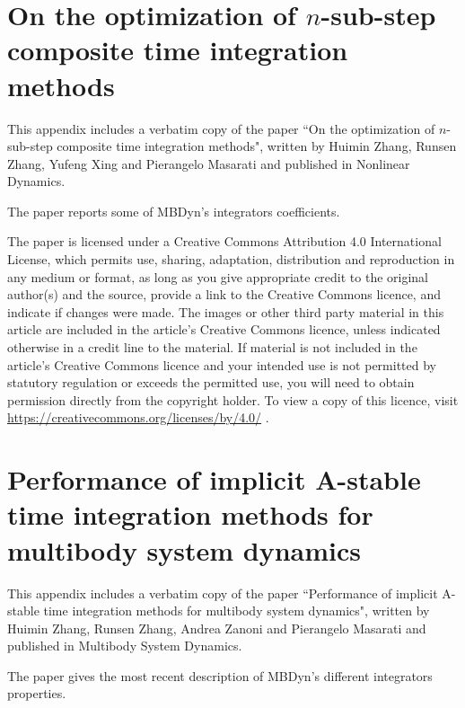\documentclass[10pt,fleqn,subeqn]{report}
\begin{document}



\appendix
\chapter{On the optimization of $n$-sub-step composite time
integration methods}
\label{appendix:integrators1}
This appendix includes a verbatim copy of the paper ``On the optimization of $n$-sub-step composite time
integration methods", written by Huimin Zhang,
Runsen Zhang, Yufeng Xing and Pierangelo Masarati and published in
Nonlinear Dynamics. 

The paper reports some of MBDyn's integrators coefficients.

The paper is licensed under a Creative Commons Attribution 4.0
International License, which permits use, sharing, adaptation, distribution and
reproduction in any medium or format, as long as you give appropriate credit to
the original author(s) and the source, provide a link to the Creative Commons
licence, and indicate if changes were made. The images or other third party
material in this article are included in the article's Creative Commons licence,
unless indicated otherwise in a credit line to the material. If material is not
included in the article's Creative Commons licence and your intended use is not
permitted by statutory regulation or exceeds the permitted use, you will need
to obtain permission directly from the copyright holder. To view a copy of this
licence, visit \href{https://creativecommons.org/licenses/by/4.0/}{https://creativecommons.org/licenses/by/4.0/} .


\chapter{Performance of implicit A-stable time integration methods
for multibody system dynamics}
\label{appendix:integrators2}
This appendix includes a verbatim copy of the paper ``Performance of implicit A-stable time integration methods
for multibody system dynamics", written by Huimin Zhang,
Runsen Zhang, Andrea Zanoni and Pierangelo Masarati and published in
Multibody System Dynamics. 

The paper gives the most recent description of
MBDyn's different integrators properties.
\end{document}
